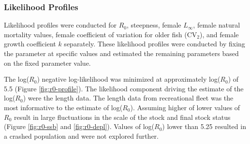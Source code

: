 \documentclass[11pt,
  english,
  a4paper,
]{article}
\begin{document}
\leavevmode\tagmcend\tagstructend\par


\hypertarget{likelihood-profiles}{%
\subsubsection{Likelihood Profiles}\label{likelihood-profiles}}

\leavevmode\tagmcend\tagstructend


Likelihood profiles were conducted for {\(R_0\)\leavevmode\tagmcend\tagstructend}, steepness, female {\(L_{\infty}\)\leavevmode\tagmcend\tagstructend}, female natural mortality values, female coefficient of variation for older fish ({\(\text{CV}_2\)\leavevmode\tagmcend\tagstructend}), and female growth coefficient {\(k\)\leavevmode\tagmcend\tagstructend} separately. These likelihood profiles were conducted by fixing the parameter at specific values and estimated the remaining parameters based on the fixed parameter value.

\leavevmode\tagmcend\tagstructend\par


The log({\(R_0\)\leavevmode\tagmcend\tagstructend}) negative log-likelihood was minimized at approximately log({\(R_0\)\leavevmode\tagmcend\tagstructend}) of 5.5 (Figure \ref{fig:r0-profile}). The likelihood component driving the estimate of the log({\(R_0\)\leavevmode\tagmcend\tagstructend}) were the length data. The length data from recreational fleet was the most informative to the estimate of log({\(R_0\)\leavevmode\tagmcend\tagstructend}). Assuming higher of lower values of {\(R_0\)\leavevmode\tagmcend\tagstructend} result in large fluctuations in the scale of the stock and final stock status (Figure \ref{fig:r0-ssb} and \ref{fig:r0-depl}). Values of log({\(R_0\)\leavevmode\tagmcend\tagstructend}) lower than 5.25 resulted in a crashed population and were not explored further.
\end{document}
